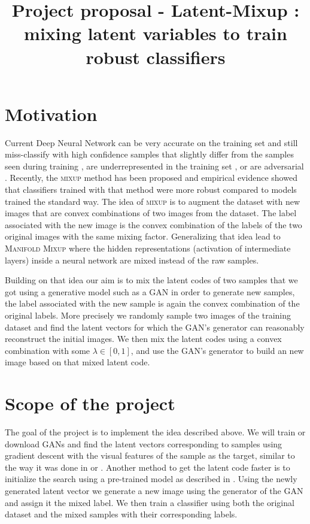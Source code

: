 \documentclass{article}
\title{\vspace{-3.8cm}Project proposal - Latent-Mixup : mixing latent variables to train robust classifiers\vspace{-1.8cm}}
\date{}
\begin{document}
\maketitle

\section{Motivation}
Current Deep Neural Network can be very accurate on the training set and still miss-classify with high confidence samples that slightly differ from the samples seen during training \cite{ben2010theory}, are underrepresented in the training set \cite{dro-hashimoto}, or are adversarial \cite{adv-szegedy}. Recently, the \textsc{mixup} method has been proposed \cite{mixup1} and empirical evidence showed that classifiers trained with that method were more robust compared to models trained the standard way. The idea of \textsc{mixup} is to augment the dataset with new images that are convex combinations of two images from the dataset. The label associated with the new image is the convex combination of the labels of the two original images with the same mixing factor. Generalizing that idea lead to \textsc{Manifold Mixup} where the hidden representations (activation of intermediate layers) inside a neural network are mixed instead of the raw samples.

Building on that idea our aim is to mix the latent codes of two samples that we got using a generative model such as a GAN \cite{gan} in order to generate new samples, the label associated with the new sample is again the convex combination of the original labels. More precisely we randomly sample two images of the training dataset and find the latent vectors for which the GAN's generator can reasonably reconstruct the initial images. We then mix the latent codes using a convex combination with some $\lambda \in [0,1]$, and use the GAN's generator to build an new image based on that mixed latent code.
\vspace{-0.2cm}
\section{Scope of the project}
The goal of the project is to implement the idea described above. We will train or download GANs and find the latent vectors corresponding to samples using gradient descent with the visual features of the sample as the target, similar to the way it was done in \cite{latentVector} or \cite{ytLatentVector}. Another method to get the latent code faster is to initialize the search using a pre-trained model as described in \cite{ytLatentVector}. Using the newly generated latent vector we generate a new image using the generator of the GAN and assign it the mixed label. We then train a classifier using both the original dataset and the mixed samples with their corresponding labels. 
\end{document}

